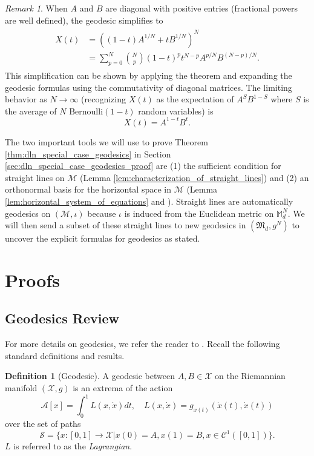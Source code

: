 \documentclass{amsart}
\theoremstyle{definition}
\newtheorem{definition}[theorem]{Definition}
\theoremstyle{remark}
\newtheorem{remark}[theorem]{Remark}
\numberwithin{equation}{section}
\begin{document}
\begin{remark}
When $A$ and $B$ are diagonal with positive entries (fractional powers are well defined), the geodesic simplifies to
\begin{align}
\begin{split}
    X(t) &= \left((1-t)A^{1/N}+ tB^{1/N}\right)^N \\
    &= \sum_{p=0}^N\binom{N}{p} (1-t)^pt^{N-p}A^{p/N}B^{(N-p)/N}.
\end{split}
\end{align}
This simplification can be shown by applying the theorem and expanding the geodesic formulas using the commutativity of diagonal matrices.  The limiting behavior as $N \to \infty$ (recognizing $X(t)$ as the expectation of $A^SB^{1-S}$ where $S$ is the average of $N$ Bernoulli$(1-t)$ random variables) is 
\begin{equation}\label{eq:infinite_depth_geodesic}
    X(t) = A^{1-t}B^t.
\end{equation}
\end{remark}

The two important tools we will use to prove Theorem \ref{thm:dln_special_case_geodesics} in Section \ref{sec:dln_special_case_geodesics_proof} are (1) the sufficient condition for straight lines on $\mathcal{M}$ (Lemma \ref{lem:characterization_of_straight_lines}) and (2) an orthonormal basis for the horizontal space in $\mathcal{M}$ (Lemma \ref{lem:horizontal_system_of_equations} and \cite{menon2025entropy, tianmin2024}). Straight lines are automatically geodesics on $(\mathcal{M}, \iota)$ because $\iota$ is induced from the Euclidean metric on $\mathbb{M}_d^N$. We will then send a subset of these straight lines to new geodesics in $(\mathfrak{M}_d, g^N)$ to uncover the explicit formulas for geodesics as stated.

\section{Proofs}
\subsection{Geodesics Review}
For more details on geodesics, we refer the reader to \cite{do1992riemannian}. Recall the following standard definitions and results.
\begin{definition}[Geodesic]
A geodesic between $A, B \in \mathcal{X}$ on the Riemannian manifold $(\mathcal{X}, g)$ is an extrema of the action 
\begin{equation}
    \mathcal{A}[x] = \int_0^1 L(x, \dot x)   dt, \quad L(x, \dot{x}) = g_{x(t)} (\dot{x}(t), \dot{x}(t))
\end{equation}
over the set of paths
\begin{equation}
    \mathcal{S} = \{x: [0,1] \to \mathcal{X} | x(0) = A, x(1) = B, x\in \mathcal{C}^1([0,1])\}.
\end{equation}
$L$ is referred to as the \textit{Lagrangian}.
\end{definition}
\end{document}
